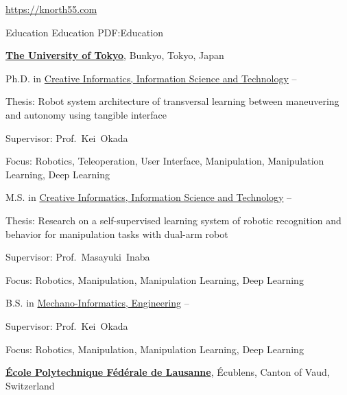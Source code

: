 \documentclass[letterpaper,MMMyyyy,nonstopmode]{simpleresumecv}
\newcommand{\CVAuthor}{Shingo Kitagawa}
\newcommand{\CVWebpage}{https://knorth55.com}
\begin{document}

\Title{\CVAuthor}

\begin{SubTitle}
\href{\CVWebpage}
{\url{\CVWebpage}}
\end{SubTitle}

\begin{Body}


\Section
{Education}
{Education}
{PDF:Education}

\Entry
\href{https://www.u-tokyo.ac.jp/en/}
{\textbf{The University of Tokyo}},
Bunkyo, Tokyo, Japan
\Gap

\Gap
Ph.D. in
\href{https://www.i.u-tokyo.ac.jp/index_e.shtml}
{Creative Informatics, Information Science and Technology}
\hfill
{} --
\begin{Detail}
Thesis:
Robot system architecture of transversal learning between maneuvering and autonomy using tangible interface
\par
Supervisor:
Prof.~Kei~Okada
\par
Focus:
Robotics, Teleoperation, User Interface, Manipulation, Manipulation Learning, Deep Learning
\end{Detail}
\Gap

\Gap
M.S. in
\href{https://www.i.u-tokyo.ac.jp/index_e.shtml}
{Creative Informatics, Information Science and Technology}
\hfill
{} --
\begin{Detail}
Thesis:
Research on a self-supervised learning system of robotic recognition and behavior for manipulation tasks with dual-arm robot
\par
Supervisor:
Prof.~Masayuki~Inaba
\par
Focus:
Robotics, Manipulation, Manipulation Learning, Deep Learning
\end{Detail}
\Gap

\Gap
B.S. in
\href{http://www.t.u-tokyo.ac.jp/en/foe}
{Mechano-Informatics, Engineering}
\hfill
{} --
\begin{Detail}
Supervisor:
Prof.~Kei~Okada
\par
Focus:
Robotics, Manipulation, Manipulation Learning, Deep Learning
\end{Detail}
\Gap

\Gap
\Entry
\href{https://www.epfl.ch/en/}
{\textbf{École Polytechnique Fédérale de Lausanne}},
Écublens, Canton of Vaud, Switzerland
\Gap


\end{Body}
\end{document}
